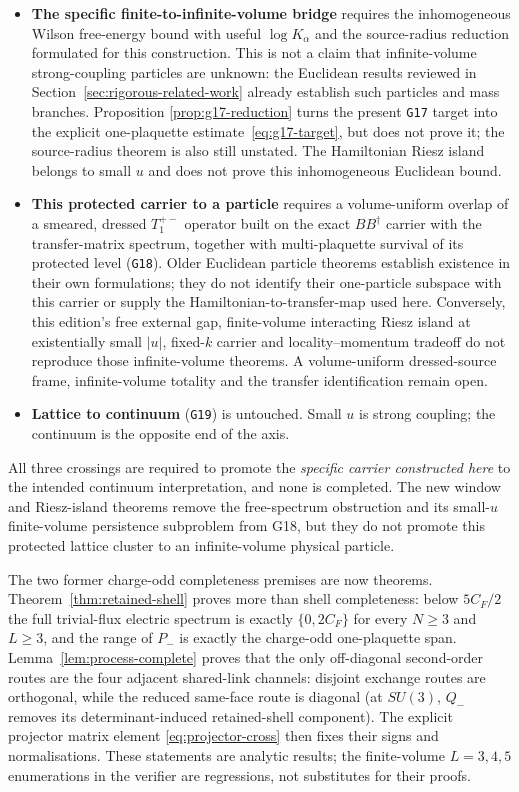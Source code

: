 \documentclass[11pt]{article}
\theoremstyle{plain}
\theoremstyle{definition}
\theoremstyle{remark}
\newcommand{\CF}{C_F}
\newcommand{\dg}{^{\dagger}}
\begin{document}
\begin{itemize}\itemsep2pt
\item \textbf{The specific finite-to-infinite-volume bridge} requires the
  inhomogeneous Wilson free-energy bound with useful $\log K_\alpha$ and the
  source-radius reduction formulated for this construction.  This is not a
  claim that infinite-volume strong-coupling particles are unknown: the
  Euclidean results reviewed in Section~\ref{sec:rigorous-related-work}
  already establish such particles and mass branches.  Proposition
  \ref{prop:g17-reduction} turns the present \texttt{G17} target into the
  explicit one-plaquette estimate~\eqref{eq:g17-target}, but does not prove
  it; the source-radius theorem is also still unstated.  The Hamiltonian Riesz
  island belongs to small $u$ and does not prove this inhomogeneous Euclidean
  bound.
\item \textbf{This protected carrier to a particle} requires a volume-uniform
  overlap of a smeared, dressed $T_1^{+-}$ operator built on the exact
  $BB\dg$ carrier with the transfer-matrix spectrum, together with
  multi-plaquette survival of its protected level (\texttt{G18}).  Older
  Euclidean particle theorems establish existence in their own formulations;
  they do not identify their one-particle subspace with this carrier or supply
  the Hamiltonian-to-transfer-map used here.  Conversely, this edition's free
  external gap, finite-volume interacting Riesz island at existentially small
  $|u|$, fixed-$k$ carrier and locality--momentum tradeoff do not reproduce
  those infinite-volume theorems.  A volume-uniform dressed-source frame,
  infinite-volume totality and the transfer identification remain open.
\item \textbf{Lattice to continuum} (\texttt{G19}) is untouched. Small $u$ is
  strong coupling; the continuum is the opposite end of the axis.
\end{itemize}

\noindent All three crossings are required to promote the \emph{specific
carrier constructed here} to the intended continuum interpretation, and none
is completed.  The new window and Riesz-island theorems remove the
free-spectrum obstruction and its small-$u$ finite-volume persistence
subproblem from G18, but they do not promote this protected lattice cluster to
an infinite-volume physical particle.

The two former charge-odd completeness premises are now theorems.
Theorem~\ref{thm:retained-shell} proves more than shell completeness: below
$5\CF/2$ the full trivial-flux electric spectrum is exactly $\{0,2\CF\}$ for
every $N\ge3$ and $L\ge3$, and the range of $P_-$ is exactly the charge-odd
one-plaquette span.
Lemma~\ref{lem:process-complete} proves that the only off-diagonal
second-order routes are the four adjacent shared-link channels: disjoint
exchange routes are orthogonal, while the reduced same-face route is diagonal
(at $SU(3)$, $Q_-$ removes its determinant-induced retained-shell component).
The explicit
projector matrix element \eqref{eq:projector-cross} then fixes their signs and
normalisations. These statements are analytic results; the finite-volume
$L=3,4,5$ enumerations in the verifier are regressions, not substitutes for
their proofs.
\end{document}
